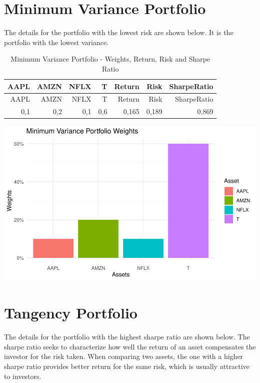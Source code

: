 \documentclass[
]{article}
\begin{document}
\newpage

\hypertarget{minimum-variance-portfolio}{%
\section{Minimum Variance Portfolio}\label{minimum-variance-portfolio}}

The details for the portfolio with the lowest risk are shown below. It
is the portfolio with the lowest variance.

\begin{longtable}[]{@{}rrrrrrr@{}}
\caption{Minimum Variance Portfolio - Weights, Return, Risk and Sharpe
Ratio}\tabularnewline
\toprule()
AAPL & AMZN & NFLX & T & Return & Risk & SharpeRatio \\
\midrule()
\endfirsthead
\toprule()
AAPL & AMZN & NFLX & T & Return & Risk & SharpeRatio \\
\midrule()
\endhead
0,1 & 0,2 & 0,1 & 0,6 & 0,165 & 0,189 & 0,869 \\
\bottomrule()
\end{longtable}

\begin{center}\includegraphics{EfficientFrontier_files/figure-latex/plot Minimum Variance Portfolio-1} \end{center}

\newpage

\hypertarget{tangency-portfolio}{%
\section{Tangency Portfolio}\label{tangency-portfolio}}

The details for the portfolio with the highest sharpe ratio are shown
below. The sharpe ratio seeks to characterize how well the return of an
asset compensates the investor for the risk taken. When comparing two
assets, the one with a higher sharpe ratio provides better return for
the same risk, which is usually attractive to investors.
\end{document}

